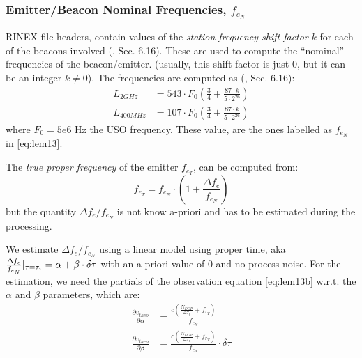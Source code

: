 \subsubsection{Emitter/Beacon Nominal Frequencies, $f_{e_N}$}
\label{sssec:beacon-nominal-frequencies}

RINEX file headers, contain values of the \emph{station frequency shift 
factor} $k$ for each of the beacons involved (\cite{DORISRNX3}, Sec. 6.16). 
These are used to compute the ``nominal'' frequencies of the beacon/emitter. 
(usually, this shift factor is just $0$, but it can be an integer 
$k \neq 0$). The frequencies are computed as (\cite{DORISRNX3}, Sec. 6.16):
\begin{equation}
  \begin{aligned}
    L_{2GHz}   &= 543 \cdot F_0 \left( \frac{3}{4} + \frac{87\cdot k}{5 \cdot 2^{26}} \right) \\
    L_{400MHz} &= 107 \cdot F_0 \left( \frac{3}{4} + \frac{87\cdot k}{5 \cdot 2^{26}} \right) 
    \label{eq:nominal-freq}
  \end{aligned}
\end{equation}
where $F_0 = 5e6 \text{ Hz}$ the USO frequency. These value, are the ones 
labelled as $f_{e_N}$ in \ref{eq:lem13}.

The \emph{true proper frequency} of the emitter $f_{e_T}$, can be computed 
from:
\begin{equation}
  f_{e_T} = f_{e_N} \cdot \left( 1 + \frac{\Delta f_e}{f_{e_N}} \right)
\end{equation}
but the quantity $\Delta f_e / f_{e_N}$ is not know a-priori and has to be 
estimated during the processing.

We estimate $\Delta f_e / f_{e_N}$ using a \colorbox{blue!20}{linear model using proper time}, 
aka $\frac{\Delta f_e}{f_{e_N}}|_{\tau=\tau _i} = \alpha + \beta \cdot \delta \tau$
with an a-priori value of 0 and no process noise. For the estimation, we need 
the partials of the observation equation \ref{eq:lem13b} w.r.t. the $\alpha$ and 
$\beta$ parameters, which are:
\begin{equation}
  \begin{aligned}
  \frac{\partial v_{theo}}{\partial \alpha} &= 
    \frac{c(\frac{N_{DOP}}{\Delta\tau_r} + f_{r_T})}{f_{e_N}} \\
  \frac{\partial v_{theo}}{\partial \beta} &= 
    \frac{c(\frac{N_{DOP}}{\Delta\tau_r} + f_{r_T})}{f_{e_N}} \cdot \delta \tau
  \end{aligned}
\end{equation}

